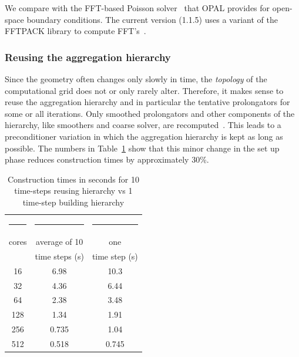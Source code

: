 We compare with the FFT-based Poisson solver~\cite{hoea:88} that
\textsc{OPAL} provides for open-space boundary conditions.  The current
version (1.1.5) uses a variant of the FFTPACK library to compute
FFT's~\cite{FFTPACK, Swar:82}.

\subsubsection*{Reusing the aggregation hierarchy}

Since the geometry often changes only slowly in time, the
\emph{topology} of the computational grid does not or only rarely alter.
Therefore, it makes sense to reuse the aggregation hierarchy and in
particular the tentative prolongators for some or all iterations.  Only
smoothed prolongators and other components of the hierarchy, like
smoothers and coarse solver, are recomputed~\cite[p.16]{gsht:06}.
This leads to a preconditioner variation in which the aggregation
hierarchy is kept as long as possible.  The numbers in
Table~\ref{tbl:timings_reuse_hierarchy} show that this minor change in
the set up phase reduces construction times by approximately 30\%.

\begin{table}[ht]
  \begin{center}
    \begin{tabular}{ccc}
      \hline
      \rule{15mm}{0mm} & \rule{30mm}{0mm} & \rule{30mm}{0mm} \\[-4mm]
      cores & average of 10 & one \\
      &time steps (s) &  time step (s) \\
      \hline
      16  & 6.98 & 10.3 \\
      32  & 4.36 &  6.44 \\
      64  & 2.38 &  3.48 \\
      128 & 1.34 &  1.91 \\ 
      256 & 0.735 &  1.04 \\
      512 & 0.518 &  0.745 \\
      \hline
    \end{tabular}
    \caption{Construction times in seconds for 10 time-steps reusing
      hierarchy vs 1 time-step building hierarchy}
    \label{tbl:timings_reuse_hierarchy}
  \end{center}
\end{table}

